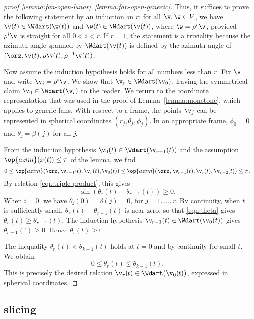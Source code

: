 \begin{proof}[proof \eqref{lemma:fan-open-lunar}~\eqref{lemma:fan-open-generic}]
Thus, it suffices to prove the following statement by an induction on
$r$: for all $\v,\w\in V$, we have $\v(t)\in \Wdart(\w(t))$ and
$\w(t)\in \Wdart(\v(t))$, where $\w=\rho^r\v$, provided $\rho^i\v$ is
straight for all $0<i<r$.  If $r=1$, the statement is a triviality because
the azimuth angle spanned by $\Wdart(\v(t))$ is defined by the azimuth
angle of $(\orz,\v(t),\rho\v(t),\rho^{-1}\v(t))$.

Now assume the induction hypothesis holds for all numbers less than
$r$.  Fix $\v$ and write $\v_i = \rho^i \v$.  We show that $\v_r\in
\Wdart(\v_0)$, leaving the symmetrical claim $\v_0\in \Wdart(\v_r)$ to
the reader.  We return to the coordinate representation that was used
in the proof of Lemma~\ref{lemma:monotone}, which applies to generic
fans.  With respect to a frame, the points $\v_j$ can be represented
in spherical coordinates $(r_j,\theta_j,\phi_j)$.  In an appropriate
frame, $\phi_0=0$ and $\theta_j=\beta(j)$ for all $j$.

From the  induction hypothesis $\v_0(t)\in \Wdart(\v_{r-1}(t))$
and the assumption $\op{azim}(x(t))\le\pi$ of the lemma, we find
\[
0\le \op{azim}(\orz,\v_{r-1}(t),\v_r(t),\v_0(t))\le
\op{azim}(\orz,\v_{r-1}(t),\v_r(t),\v_{r-2}(t))\le \pi.
\]
By relation \eqref{eqn:triple-product}, this gives
\begin{equation}\label{eqn:theta}
\sin(\theta_r(t)-\theta_{r-1}(t))\ge 0.
\end{equation}
When $t=0$, we have $\theta_j(0)=\beta(j)=0$, for $j=1,\ldots,r$.  By
continuity, when $t$ is sufficiently small,
$\theta_r(t)-\theta_{r-1}(t)$ is near zero, so that \eqref{eqn:theta}
gives $\theta_r(t)\ge \theta_{r-1}(t)$.  The induction hypothesis
$\v_{r-1}(t)\in \Wdart(\v_0(t))$ gives $\theta_{r-1}(t)\ge0$.  Hence
$\theta_r(t)\ge0$.

The inequality $\theta_r(t) < \theta_{k-1}(t)$ holds at $t=0$ and by continuity
for small $t$.  We obtain
\[
0 \le \theta_r(t) \le \theta_{k-1}(t).
\]
This is precisely the desired relation $\v_r(t)\in \Wdart(\v_0(t))$,
expressed in spherical coordinates.
\end{proof}



\subsection{slicing}




